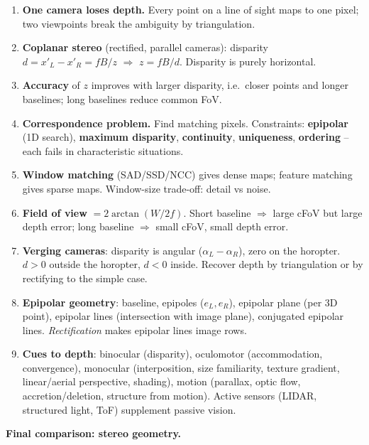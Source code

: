 \begin{keybox}
\begin{enumerate}
  \item \textbf{One camera loses depth.} Every point on a line of sight maps to one pixel; two viewpoints break the ambiguity by triangulation.
  \item \textbf{Coplanar stereo} (rectified, parallel cameras): disparity $d = x'_L - x'_R = fB/z$ $\Rightarrow$ $z = fB/d$. Disparity is purely horizontal.
  \item \textbf{Accuracy} of $z$ improves with larger disparity, i.e.\ closer points and longer baselines; long baselines reduce common FoV.
  \item \textbf{Correspondence problem.} Find matching pixels. Constraints: \textbf{epipolar} (1D search), \textbf{maximum disparity}, \textbf{continuity}, \textbf{uniqueness}, \textbf{ordering} -- each fails in characteristic situations.
  \item \textbf{Window matching} (SAD/SSD/NCC) gives dense maps; feature matching gives sparse maps. Window-size trade-off: detail vs noise.
  \item \textbf{Field of view} $= 2\arctan(W/2f)$. Short baseline $\Rightarrow$ large cFoV but large depth error; long baseline $\Rightarrow$ small cFoV, small depth error.
  \item \textbf{Verging cameras}: disparity is angular ($\alpha_L - \alpha_R$), zero on the horopter. $d > 0$ outside the horopter, $d < 0$ inside. Recover depth by triangulation or by rectifying to the simple case.
  \item \textbf{Epipolar geometry}: baseline, epipoles ($e_L, e_R$), epipolar plane (per 3D point), epipolar lines (intersection with image plane), conjugated epipolar lines. \emph{Rectification} makes epipolar lines image rows.
  \item \textbf{Cues to depth}: binocular (disparity), oculomotor (accommodation, convergence), monocular (interposition, size familiarity, texture gradient, linear/aerial perspective, shading), motion (parallax, optic flow, accretion/deletion, structure from motion). Active sensors (LIDAR, structured light, ToF) supplement passive vision.
\end{enumerate}
\end{keybox}

\textbf{Final comparison: stereo geometry.}

